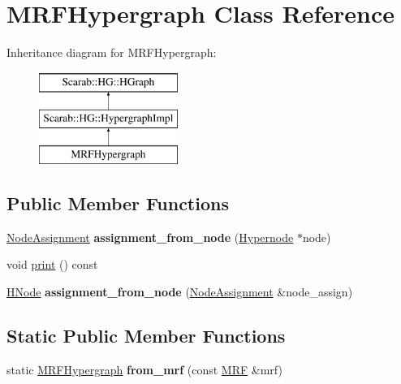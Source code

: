 \hypertarget{class_m_r_f_hypergraph}{
\section{MRFHypergraph Class Reference}
\label{class_m_r_f_hypergraph}
}
Inheritance diagram for MRFHypergraph:\begin{figure}[H]
\begin{center}
\leavevmode
\includegraphics[height=3cm]{class_m_r_f_hypergraph}
\end{center}
\end{figure}
\subsection*{Public Member Functions}
\begin{DoxyCompactItemize}
\item 
\hypertarget{class_m_r_f_hypergraph_a5c717b35842c25c6be9e827f0aa31708}{
\hyperlink{struct_node_assignment}{NodeAssignment} {\bfseries assignment\_\-from\_\-node} (\hyperlink{class_scarab_1_1_h_g_1_1_hypernode}{Hypernode} $\ast$node)}
\label{class_m_r_f_hypergraph_a5c717b35842c25c6be9e827f0aa31708}

\item 
void \hyperlink{class_m_r_f_hypergraph_aaac6b68c3ece41ddd1f8107e961879bc}{print} () const 
\item 
\hypertarget{class_m_r_f_hypergraph_a34f14a3a9cf0d01c7fbfc11e1caa20ba}{
\hyperlink{class_scarab_1_1_h_g_1_1_hypernode}{HNode} {\bfseries assignment\_\-from\_\-node} (\hyperlink{struct_node_assignment}{NodeAssignment} \&node\_\-assign)}
\label{class_m_r_f_hypergraph_a34f14a3a9cf0d01c7fbfc11e1caa20ba}

\end{DoxyCompactItemize}
\subsection*{Static Public Member Functions}
\begin{DoxyCompactItemize}
\item 
\hypertarget{class_m_r_f_hypergraph_af8808e644c7ff0c938f4fbd9e473dfba}{
static \hyperlink{class_m_r_f_hypergraph}{MRFHypergraph} {\bfseries from\_\-mrf} (const \hyperlink{class_m_r_f}{MRF} \&mrf)}
\label{class_m_r_f_hypergraph_af8808e644c7ff0c938f4fbd9e473dfba}

\end{DoxyCompactItemize}


